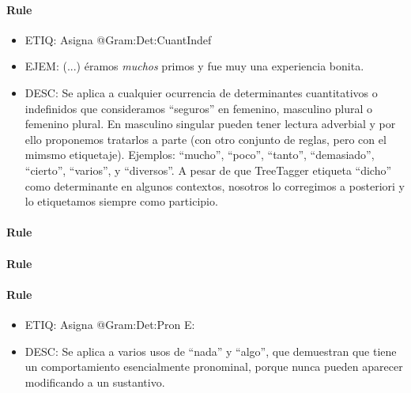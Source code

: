 \documentclass[11pt]{report}
\begin{document}
\paragraph*{Rule}
\begin{itemize}
\item ETIQ: Asigna @Gram:Det:CuantIndef
\item EJEM: (...) éramos \emph{muchos} primos y fue muy una experiencia bonita.
\item DESC: Se aplica a cualquier ocurrencia de determinantes cuantitativos o indefinidos que consideramos ``seguros'' en femenino, masculino plural o femenino plural. En masculino singular pueden tener lectura adverbial y por ello proponemos tratarlos a parte (con otro conjunto de reglas, pero con el mimsmo etiquetaje). Ejemplos: ``mucho'', ``poco'', ``tanto'', ``demasiado'', ``cierto'', ``varios'', y ``diversos''. A pesar de que TreeTagger etiqueta  ``dicho'' como determinante en algunos contextos, nosotros lo corregimos a posteriori y lo etiquetamos siempre como participio.
\end{itemize}

\paragraph*{Rule}
\paragraph*{Rule}
\paragraph*{Rule}
\begin{itemize}
\item ETIQ: Asigna @Gram:Det:Pron
 E: 
\item DESC: Se aplica a varios usos de ``nada'' y ``algo'', que demuestran que tiene un comportamiento esencialmente pronominal, porque nunca pueden aparecer modificando a un sustantivo.
\end{itemize}
\end{document}
